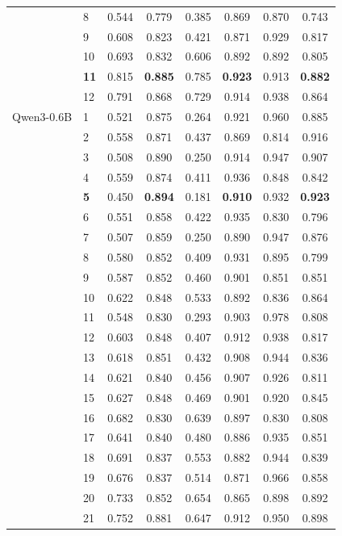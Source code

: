 \begin{longtable}{llcccccc}
 & 8 & 0.544 & 0.779 & 0.385 & 0.869 & 0.870 & 0.743 \\
 & 9 & 0.608 & 0.823 & 0.421 & 0.871 & 0.929 & 0.817 \\
 & 10 & 0.693 & 0.832 & 0.606 & 0.892 & 0.892 & 0.805 \\
 & \textbf{11} & 0.815 & \textbf{0.885} & 0.785 & \textbf{0.923} & 0.913 & \textbf{0.882} \\
 & 12 & 0.791 & 0.868 & 0.729 & 0.914 & 0.938 & 0.864 \\
\midrule
Qwen3-0.6B & 1 & 0.521 & 0.875 & 0.264 & 0.921 & 0.960 & 0.885 \\
 & 2 & 0.558 & 0.871 & 0.437 & 0.869 & 0.814 & 0.916 \\
 & 3 & 0.508 & 0.890 & 0.250 & 0.914 & 0.947 & 0.907 \\
 & 4 & 0.559 & 0.874 & 0.411 & 0.936 & 0.848 & 0.842 \\
 & \textbf{5} & 0.450 & \textbf{0.894} & 0.181 & \textbf{0.910} & 0.932 & \textbf{0.923} \\
 & 6 & 0.551 & 0.858 & 0.422 & 0.935 & 0.830 & 0.796 \\
 & 7 & 0.507 & 0.859 & 0.250 & 0.890 & 0.947 & 0.876 \\
 & 8 & 0.580 & 0.852 & 0.409 & 0.931 & 0.895 & 0.799 \\
 & 9 & 0.587 & 0.852 & 0.460 & 0.901 & 0.851 & 0.851 \\
 & 10 & 0.622 & 0.848 & 0.533 & 0.892 & 0.836 & 0.864 \\
 & 11 & 0.548 & 0.830 & 0.293 & 0.903 & 0.978 & 0.808 \\
 & 12 & 0.603 & 0.848 & 0.407 & 0.912 & 0.938 & 0.817 \\
 & 13 & 0.618 & 0.851 & 0.432 & 0.908 & 0.944 & 0.836 \\
 & 14 & 0.621 & 0.840 & 0.456 & 0.907 & 0.926 & 0.811 \\
 & 15 & 0.627 & 0.848 & 0.469 & 0.901 & 0.920 & 0.845 \\
 & 16 & 0.682 & 0.830 & 0.639 & 0.897 & 0.830 & 0.808 \\
 & 17 & 0.641 & 0.840 & 0.480 & 0.886 & 0.935 & 0.851 \\
 & 18 & 0.691 & 0.837 & 0.553 & 0.882 & 0.944 & 0.839 \\
 & 19 & 0.676 & 0.837 & 0.514 & 0.871 & 0.966 & 0.858 \\
 & 20 & 0.733 & 0.852 & 0.654 & 0.865 & 0.898 & 0.892 \\
 & 21 & 0.752 & 0.881 & 0.647 & 0.912 & 0.950 & 0.898 \\

\end{longtable}
